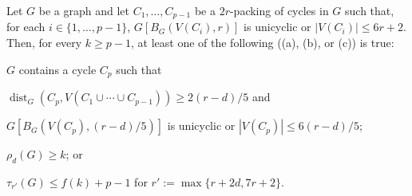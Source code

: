 \documentclass{patmorin}
\renewcommand{\ge}{\geqslant}
\renewcommand{\le}{\leqslant}
\DeclareMathOperator{\dist}{dist}
\begin{document}
\begin{lem}\label{a_or_b}
  Let $G$ be a graph and let $C_1,\ldots,C_{p-1}$ be a $2r$-packing of cycles in $G$ such that, for each $i\in\{1,\ldots,p-1\}$,  $G[B_G(V(C_i),r)]$ is unicyclic or $|V(C_i)|\le 6r+2$.  Then, for every $k\ge p-1$, at least one of the following ((a), (b), or (c)) is true:
  \begin{compactenum}[(a)]
    \item $G$ contains a cycle $C_p$ such that
    \begin{compactenum}[(i)]
      \item $\dist_G(C_p,V(C_1\cup\cdots\cup C_{p-1}))\ge 2(r-d)/5$ and
      \item $G[B_G(V(C_p),(r-d)/5)]$ is unicyclic or $|V(C_p)|\le 6(r-d)/5$;
    \end{compactenum}
    \item $\rho_d(G)\ge k$; or
    \item $\tau_{r'}(G) \le f(k)+p-1$ for $r':=\max\{r+2d,7r+2\}$.
  \end{compactenum}
\end{lem}
\end{document}
